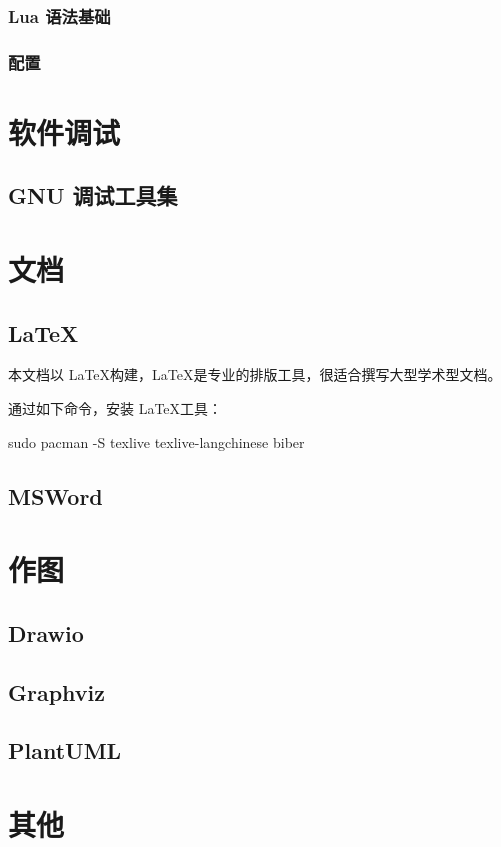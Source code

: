 \subsubsection{Lua 语法基础}

\subsubsection{配置}

\section{软件调试}
\subsection{GNU 调试工具集}

\section{文档}

\subsection{\LaTeX}

本文档以 \LaTeX 构建，\LaTeX 是专业的排版工具，很适合撰写大型学术型文档。


通过如下命令，安装 \LaTeX 工具：

\begin{lstcode}
  sudo pacman -S texlive texlive-langchinese biber
\end{lstcode}

\subsection{MSWord}

\section{作图}
\subsection{Drawio}
\subsection{Graphviz}
\subsection{PlantUML}

\section{其他}
